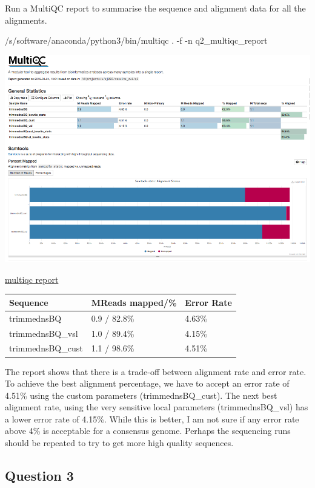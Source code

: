 \documentclass[]{article}
\newenvironment{Shaded}{\begin{snugshade}}{\end{snugshade}}
\newcommand{\ExtensionTok}[1]{#1}
\newcommand{\NormalTok}[1]{#1}
\begin{document}
Run a MultiQC report to summarise the sequence and alignment data for
all the alignments.

\begin{Shaded}
\begin{Highlighting}[]
\ExtensionTok{/s/software/anaconda/python3/bin/multiqc}\NormalTok{ . -f -n q2_multiqc_report}
\end{Highlighting}
\end{Shaded}

\includegraphics{Multiqc_report_q2.png}

\href{/d/projects/u/sj003/results_cw1/q2_multiqc_report.html}{multiqc
report}

\begin{longtable}[]{@{}lll@{}}
\toprule
Sequence & MReads mapped/\% & Error Rate\tabularnewline
\midrule
\endhead
trimmednsBQ & 0.9 / 82.8\% & 4.63\%\tabularnewline
trimmednsBQ\_vsl & 1.0 / 89.4\% & 4.15\%\tabularnewline
trimmednsBQ\_cust & 1.1 / 98.6\% & 4.51\%\tabularnewline
\bottomrule
\end{longtable}

The report shows that there is a trade-off between alignment rate and
error rate. To achieve the best alignment percentage, we have to accept
an error rate of 4.51\% using the custom parameters (trimmednsBQ\_cust).
The next best alignment rate, using the very sensitive local parameters
(trimmednsBQ\_vsl) has a lower error rate of 4.15\%. While this is
better, I am not sure if any error rate above 4\% is acceptable for a
consensus genome. Perhaps the sequencing runs should be repeated to try
to get more high quality sequences.

\subsection{Question 3}\label{question-3}
\end{document}
